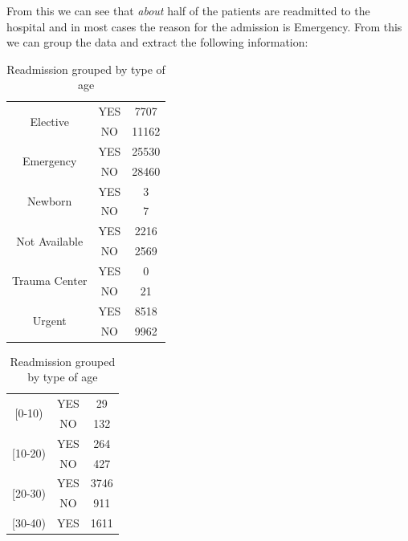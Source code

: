 \documentclass[11pt]{report}
\begin{document}
\clearpage
From this we can see that \textit{about} half of the patients are readmitted to the hospital and in most cases the reason for the admission is Emergency. From this we can group the data and extract the following information:

\begin{table}[!ht]
    \begin{minipage}[t]{.5\linewidth}
      \caption{Readmission grouped by type of admission}
      \centering
        \begin{tabular}{|c|c|c|}
\hline
\multirow{2}{*}{Elective}      & YES & 7707  \\ 
                               & NO  & 11162 \\ \hline
\multirow{2}{*}{Emergency}     & YES & 25530 \\
                               & NO  & 28460 \\ \hline 
\multirow{2}{*}{Newborn}       & YES & 3     \\
                               & NO  & 7     \\ \hline
\multirow{2}{*}{Not Available} & YES & 2216  \\
                               & NO  & 2569  \\ \hline 
\multirow{2}{*}{Trauma Center} & YES & 0     \\
                               & NO  & 21    \\ \hline
\multirow{2}{*}{Urgent}        & YES & 8518  \\
                               & NO  & 9962  \\ \hline
\end{tabular}
    \end{minipage}%
    \begin{minipage}[t]{.5\linewidth}
      \centering
        \caption{Readmission grouped by type of age}
        \begin{tabular}{|c|c|c|}
\hline
\multirow{2}{*}{[0-10)}        & YES & 29    \\ 
                               & NO  & 132   \\ \hline
\multirow{2}{*}{[10-20)}       & YES & 264   \\
                               & NO  & 427   \\ \hline 
\multirow{2}{*}{[20-30)}       & YES & 3746 \\
                               & NO  & 911   \\ \hline
\multirow{2}{*}{[30-40)}       & YES & 1611  \\

\end{tabular}
\end{minipage}
\end{table}
\end{document}
